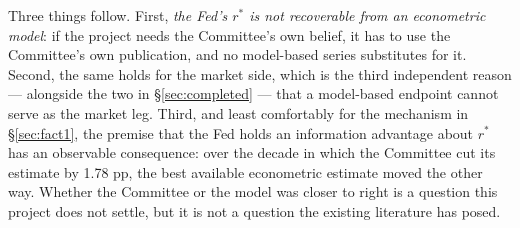 Three things follow. First, \emph{the Fed's $r^{*}$ is not recoverable from an econometric model}:
if the project needs the Committee's own belief, it has to use the Committee's own publication,
and no model-based series substitutes for it. Second, the same holds for the market side, which
is the third independent reason --- alongside the two in \S\ref{sec:completed} --- that a
model-based endpoint cannot serve as the market leg. Third, and least comfortably for the
mechanism in \S\ref{sec:fact1}, the premise that the Fed holds an information advantage about
$r^{*}$ has an observable consequence: over the decade in which the Committee cut its estimate
by 1.78 pp, the best available econometric estimate moved the other way. Whether the Committee
or the model was closer to right is a question this project does not settle, but it is not a
question the existing literature has posed.
